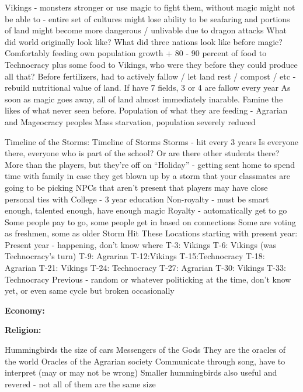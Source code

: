 \documentclass[blue]{GL2020}
\begin{document}
Vikings - monsters stronger or use magic to fight them, without magic might not be able to - entire set of cultures might lose ability to be seafaring and portions of land might become more dangerous / unlivable due to dragon attacks
What did world originally look like?  What did three nations look like before magic?
Comfortably feeding own population growth + 80 - 90 percent of food to Technocracy plus some food to Vikings, who were they before they could produce all that?
Before fertilizers, had to actively fallow / let land rest / compost / etc - rebuild nutritional value of land.  If have 7 fields, 3 or 4 are fallow every year
As soon as magic goes away, all of land almost immediately inarable.  Famine the likes of what never seen before.  Population of what they are feeding - Agrarian and Mageocracy peoples
Mass starvation, population severely reduced

Timeline of the Storms:
Timeline of Storms
Storms - hit every 3 years
Is everyone there, everyone who is part of the school?  Or are there other students there?
More than the players, but they’re off on “Holiday” - getting sent home to spend time with family in case they get blown up by a storm that your classmates are going to be picking
NPCs that aren’t present that players may have close personal ties with
College - 3 year education
Non-royalty - must be smart enough, talented enough, have enough magic
Royalty - automatically get to go
Some people pay to go, some people get in based on connections
Some are voting as freshmen, some as older
Storm Hit These Locations starting with present year:
Present year - happening, don’t know where
T-3: Vikings
T-6: Vikings (was Technocracy’s turn)
T-9: Agrarian
T-12:Vikings
T-15:Technocracy
T-18: Agrarian
T-21: Vikings
T-24: Technocracy
T-27: Agrarian
T-30: Vikings
T-33: Technocracy
Previous - random or whatever politicking at the time, don’t know yet, or even same cycle but broken occasionally
 
\textbf{Economy:}

\textbf{Religion:}

Hummingbirds the size of cars
Messengers of the Gods
They are the oracles of the world
Oracles of the Agrarian society 
Communicate through song, have to interpret (may or may not be wrong)
Smaller hummingbirds also useful and revered - not all of them are the same size
\end{document}
